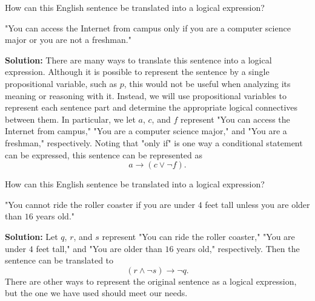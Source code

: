 \documentclass{Axon}
\begin{document}
\begin{example}\label{Example: 1}
    How can this English sentence be translated into a logical expression?
    \begin{center}
        "You can access the Internet from campus only if you are a computer science major or you are not a freshman."
    \end{center}

    \noindent
    \textbf{Solution:}
    There are many ways to translate this sentence into a logical expression. Although it is possible to represent the sentence by a single propositional variable, such as \(p\), this would not be useful when analyzing its meaning or reasoning with it. Instead, we will use propositional variables to represent each sentence part and determine the appropriate logical connectives between them. In particular, we let \(a\), \(c\), and \(f\) represent "You can access the Internet from campus," "You are a computer science major," and "You are a freshman," respectively. Noting that "only if" is one way a conditional statement can be expressed, this sentence can be represented as
    \begin{equation}
        a \to (c \lor \lnot f).
    \end{equation}
\end{example}

\begin{example}\label{Example: 2}
    How can this English sentence be translated into a logical expression?
    \begin{center}
        "You cannot ride the roller coaster if you are under \(4\) feet tall unless you are older than \(16\) years old."
    \end{center}

    \noindent
    \textbf{Solution:}
    Let \(q\), \(r\), and \(s\) represent "You can ride the roller coaster," "You are under \(4\) feet tall," and "You are older than \(16\) years old," respectively. Then the sentence can be translated to
    \begin{equation}
        (r \land \lnot s) \to \lnot q.
    \end{equation}
    There are other ways to represent the original sentence as a logical expression, but the one we have used should meet our needs.
\end{example}

\printbibliography
\end{document}
